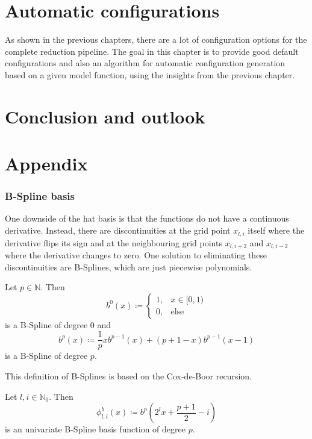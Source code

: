 \documentclass[
  a4paper,  %
  twoside,  %
  bibliography=totoc,
  headsepline,
  cleardoublepage=empty,
  parskip=half,
  draft=false
]{scrbook}
\begin{document}
\chapter{Automatic configurations}

As shown in the previous chapters, there are a lot of configuration options for the complete reduction pipeline.
The goal in this chapter is to provide good default configurations and also an algorithm for automatic configuration generation based on a given model function, using the insights from the previous chapter.

\chapter{Conclusion and outlook}



\appendix
\chapter{Appendix}

\subsection{B-Spline basis}

One downside of the hat basis is that the functions do not have a continuous derivative.
Instead, there are discontinuities at the grid point $x_{l,i}$ itself where the derivative flips its sign and at the neighbouring grid points $x_{l,i+2}$ and $x_{l,i-2}$ where the derivative changes to zero.
One solution to eliminating these discontinuities are B-Splines, which are just piecewise polynomials.
\begin{definition}[B-Splines]
Let $p \in \mathds{N}$.
Then
\begin{equation}
b^0(x) \coloneqq
\begin{cases}
    1, & x \in [0,1) \\
   0, & \text{else}
\end{cases}
\end{equation}
is a B-Spline of degree $0$ and
\begin{equation}
b^p(x) \coloneqq \frac{1}{p} xb^{p-1}(x) + (p + 1 - x) b^{p-1}(x-1) 
\end{equation}
is a B-Spline of degree $p$.
\end{definition}
This definition of B-Splines is based on the Cox-de-Boor recursion.

\begin{definition}
Let $l,i \in \mathds{N}_0$.
Then
\begin{equation}
\phi^b_{l,i}(x) \coloneqq b^p \left( 2^l x + \frac{p+1}{2} -i \right)
\end{equation}
is an univariate B-Spline basis function of degree $p$.
\end{definition}
\end{document}
